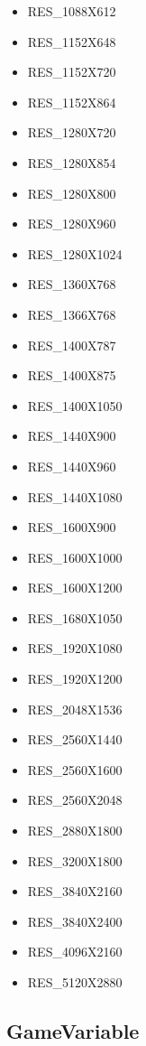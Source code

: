 \documentclass[english,bachelor,a4paper,twoside]{ppfcmthesis}
\begin{document}
\begin{itemize}
    \item RES\_1088X612
    \item RES\_1152X648
    \item RES\_1152X720
    \item RES\_1152X864
    \item RES\_1280X720
    \item RES\_1280X854
    \item RES\_1280X800
    \item RES\_1280X960
    \item RES\_1280X1024
    \item RES\_1360X768
    \item RES\_1366X768
    \item RES\_1400X787
    \item RES\_1400X875
    \item RES\_1400X1050
    \item RES\_1440X900
    \item RES\_1440X960
    \item RES\_1440X1080
    \item RES\_1600X900
    \item RES\_1600X1000
    \item RES\_1600X1200
    \item RES\_1680X1050
    \item RES\_1920X1080
    \item RES\_1920X1200
    \item RES\_2048X1536
    \item RES\_2560X1440
    \item RES\_2560X1600
    \item RES\_2560X2048
    \item RES\_2880X1800
    \item RES\_3200X1800
    \item RES\_3840X2160
    \item RES\_3840X2400
    \item RES\_4096X2160
    \item RES\_5120X2880
\end{itemize}

\subsection{GameVariable} \label{subsec:gamevar}
\end{document}
